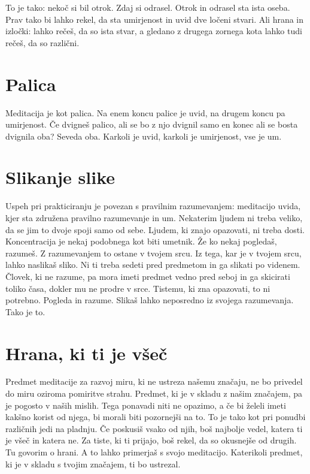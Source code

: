 To je tako: nekoč si bil otrok. Zdaj si odrasel. Otrok in odrasel sta ista oseba. Prav tako bi lahko rekel, da sta umirjenost in uvid dve ločeni stvari. Ali hrana in izločki: lahko rečeš, da so ista stvar, a gledano z drugega zornega kota lahko tudi rečeš, da so različni.

\section{Palica}

Meditacija je kot palica. Na enem koncu palice je uvid, na drugem koncu pa umirjenost. Če dvigneš palico, ali se bo z njo dvignil samo en konec ali se bosta dvignila oba? Seveda oba. Karkoli je uvid, karkoli je umirjenost, vse je um.

\section{Slikanje slike}

Uspeh pri prakticiranju je povezan s pravilnim razumevanjem: meditacijo uvida, kjer sta združena pravilno razumevanje in um. Nekaterim ljudem ni treba veliko, da se jim to dvoje spoji samo od sebe. Ljudem, ki znajo opazovati, ni treba dosti. Koncentracija je nekaj podobnega kot biti umetnik. Že ko nekaj pogledaš, razumeš. Z razumevanjem to ostane v tvojem srcu. Iz tega, kar je v tvojem srcu, lahko naslikaš sliko. Ni ti treba sedeti pred predmetom in ga slikati po videnem. Človek, ki ne razume, pa mora imeti predmet vedno pred seboj in ga skicirati toliko časa, dokler mu ne prodre v srce. Tistemu, ki zna opazovati, to ni potrebno. Pogleda in razume. Slikaš lahko neposredno iz svojega razumevanja. Tako je to.

\section{Hrana, ki ti je všeč}

Predmet meditacije za razvoj miru, ki ne ustreza našemu značaju, ne bo privedel do miru oziroma pomiritve strahu. Predmet, ki je v skladu z našim značajem, pa je pogosto v naših mislih. Tega ponavadi niti ne opazimo, a če bi želeli imeti kakšno korist od njega, bi morali biti pozornejši na to. To je tako kot pri ponudbi različnih jedi na pladnju. Če poskusiš vsako od njih, boš najbolje vedel, katera ti je všeč in katera ne. Za tiste, ki ti prijajo, boš rekel, da so okusnejše od drugih. Tu govorim o hrani. A to lahko primerjaš s svojo meditacijo. Katerikoli predmet, ki je v skladu s tvojim značajem, ti bo ustrezal.

